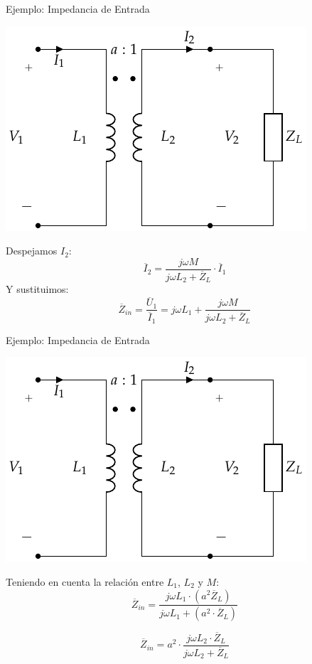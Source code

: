 \documentclass[xcolor={usenames,svgnames,dvipsnames}]{beamer}
\begin{document}
\begin{frame}[label={sec:org8d0d838}]{Ejemplo: Impedancia de Entrada}
\begin{center}
\includegraphics[height=0.45\textheight]{../figs/TrafoPerfecto_ImpedanciaSecundario.pdf}
\end{center}
Despejamos \(I_2\):
\[
  \overline{I}_2 = \frac{j \omega M}{j\omega L_2 + \overline{Z}_L} \cdot \overline{I}_1
\]
Y sustituimos:
\[
  \overline{Z}_{in} = \frac{\overline{U}_1}{\overline{I}_1} = j\omega L_1 + \frac{j \omega M}{j\omega L_2 + \overline{Z}_L}
\]
\end{frame}
\begin{frame}[label={sec:orge7b54b6}]{Ejemplo: Impedancia de Entrada}
\begin{center}
\includegraphics[height=0.45\textheight]{../figs/TrafoPerfecto_ImpedanciaSecundario.pdf}
\end{center}

Teniendo en cuenta la relación entre \(L_1\), \(L_2\) y \(M\):
\[
  \boxed{\overline{Z}_{in} = \frac{j \omega L_1 \cdot (a^2 \overline{Z}_L)}{j\omega L_1 + (a^2 \cdot \overline{Z}_L)}}
\]

\[
  \boxed{\overline{Z}_{in} = a^2 \cdot \frac{j \omega L_2 \cdot \overline{Z}_L}{j\omega L_2 + \overline{Z}_L}}
\]
\end{frame}
\end{document}
